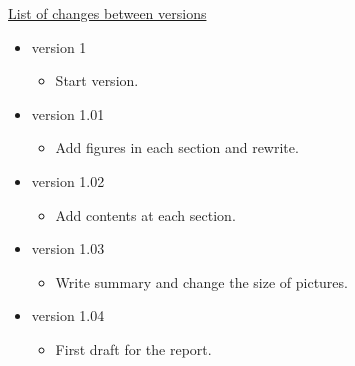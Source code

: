 \underline{List of changes between versions}

\begin{itemize}


\item version 1 
\begin{itemize}
\item Start version.
\end{itemize}

\item version 1.01
\begin{itemize}
\item Add figures in each section and rewrite.
\end{itemize}

\item version 1.02
\begin{itemize}
\item Add contents at each section.
\end{itemize}

\item version 1.03
\begin{itemize}
\item Write summary and change the size of pictures.
\end{itemize}

\item version 1.04
\begin{itemize}
\item First draft for the report.
\end{itemize}

\end{itemize}

\clearpage

